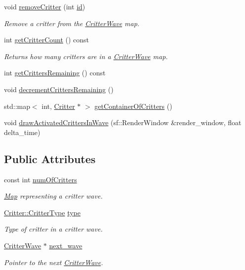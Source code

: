 \begin{DoxyCompactItemize}
void \hyperlink{class_critter_wave_aa7761b522b8774ef9b319861ae6ab844}{remove\+Critter} (int \hyperlink{class_critter_wave_aa476fc7af49dfb42fce07da5e726bbb2}{id})
\begin{DoxyCompactList}\small\item\em Remove a critter from the \hyperlink{class_critter_wave}{Critter\+Wave} map. \end{DoxyCompactList}\item 
int \hyperlink{class_critter_wave_a3c782475b9f1a73ddb658449592b8a33}{get\+Critter\+Count} () const 
\begin{DoxyCompactList}\small\item\em Returns how many critters are in a \hyperlink{class_critter_wave}{Critter\+Wave} map. \end{DoxyCompactList}\item 
int \hyperlink{class_critter_wave_af3879610de9f106cc80be0d7b4c1b1df}{get\+Critters\+Remaining} () const 
\item 
void \hyperlink{class_critter_wave_a14d2b9703371e82278c5fa3c4a2cbbd9}{decrement\+Critters\+Remaining} ()
\item 
std\+::map$<$ int, \hyperlink{class_critter}{Critter} $\ast$ $>$ \hyperlink{class_critter_wave_a00afecb75c04a7e0cd5073e20b11cce2}{get\+Container\+Of\+Critters} ()
\item 
void \hyperlink{class_critter_wave_a858c5934f74ac3148218e2f5a6a6e0b6}{draw\+Activated\+Critters\+In\+Wave} (sf\+::\+Render\+Window \&render\+\_\+window, float delta\+\_\+time)
\end{DoxyCompactItemize}
\subsection*{Public Attributes}
\begin{DoxyCompactItemize}
\item 
const int \hyperlink{class_critter_wave_a6c8edb08492ed068c5e4c5323695c29d}{num\+Of\+Critters}
\begin{DoxyCompactList}\small\item\em \hyperlink{class_map}{Map} representing a critter wave. \end{DoxyCompactList}\item 
\hyperlink{class_critter_acda8a5c3234b66101e0546d75d6f90f1}{Critter\+::\+Critter\+Type} \hyperlink{class_critter_wave_aaf7c97d4f340ffa811ca452745ef6b24}{type}
\begin{DoxyCompactList}\small\item\em Type of critter in a critter wave. \end{DoxyCompactList}\item 
\hyperlink{class_critter_wave}{Critter\+Wave} $\ast$ \hyperlink{class_critter_wave_a86ca5704a4a52a135fda195097dc4dd9}{next\+\_\+wave}
\begin{DoxyCompactList}\small\item\em Pointer to the next \hyperlink{class_critter_wave}{Critter\+Wave}. \end{DoxyCompactList}\end{DoxyCompactItemize}
